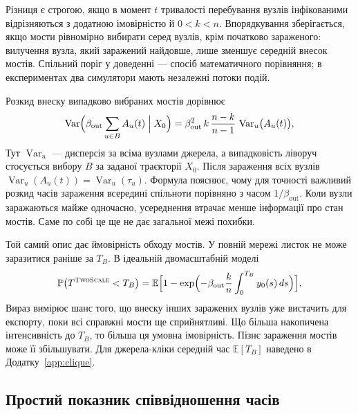 \documentclass[a4paper,fleqn]{cas-sc}
\newcommand{\TS}{\textup{\textsc{TwoScale}}}
\begin{document}
Різниця є строгою, якщо в момент $t$ тривалості перебування вузлів інфікованими відрізняються з додатною імовірністю й $0<k<n$. Впорядкування зберігається, якщо мости рівномірно вибирати серед вузлів, крім початково зараженого: вилучення вузла, який заражений найдовше, лише зменшує середній внесок мостів. Спільний поріг у доведенні --- спосіб математичного порівняння; в експериментах два симулятори мають незалежні потоки подій.
\par Розкид внеску випадково вибраних мостів дорівнює
\begin{equation}
\label{eq:hazard_variance}
\operatorname{Var}\Bigl(\beta_{\mathrm{out}}\sum_{u\in B}A_u(t)\Bigm| X_0\Bigr)=\beta_{\mathrm{out}}^2\,k\,\frac{n-k}{n-1}\,\operatorname{Var}_u\bigl(A_u(t)\bigr),
\end{equation}
Тут $\operatorname{Var}_u$ --- дисперсія за всіма вузлами джерела, а випадковість ліворуч стосується вибору $B$ за заданої траєкторії $X_0$. Після зараження всіх вузлів $\operatorname{Var}_u(A_u(t))=\operatorname{Var}_u(\tau_u)$. Формула пояснює, чому для точності важливий розкид часів зараження всередині спільноти порівняно з часом $1/\beta_{\mathrm{out}}$. Коли вузли заражаються майже одночасно, усереднення втрачає менше інформації про стан мостів. Саме по собі це ще не дає загальної межі похибки.

Той самий опис дає ймовірність обходу мостів. У повній мережі листок не може заразитися раніше за $T_B$. В ідеальній двомасштабній моделі
\begin{equation}
\label{eq:bypass}
\mathbb{P}\bigl(T^{\TS}<T_B\bigr)=\mathbb{E}\Bigl[1-\exp\Bigl(-\beta_{\mathrm{out}}\frac{k}{n}\int_0^{T_B}y_0(s)\,ds\Bigr)\Bigr],
\end{equation}
Вираз вимірює шанс того, що внеску інших заражених вузлів уже вистачить для експорту, поки всі справжні мости ще сприйнятливі. Що більша накопичена інтенсивність до $T_B$, то більша ця умовна імовірність. Пізнє зараження мостів може її збільшувати. Для джерела-кліки середній час $\mathbb{E}[T_B]$ наведено в Додатку~\ref*{app:clique}.

\subsection{Простий показник співвідношення часів}
\label{sec:descriptor}
\end{document}

